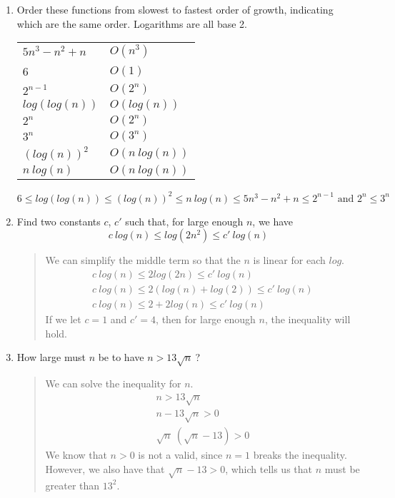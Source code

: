 \documentclass{hw}
\begin{document}

\begin{enumerate}
\item Order these functions from slowest to fastest order of growth, indicating which are the same order.
Logarithms are all base 2.
\begin{center}
\begin{tabular}{l l}
$5n^3-n^2+n$ & $O(n^3)$\\
6 & $O(1)$\\
$2^{n-1}$ & $O(2^{n})$\\
$log(log(n))$ & $O(log(n))$\\
$2^{n}$ & $O(2^n)$\\
$3^{n}$ & $O(3^n)$\\
$(log(n))^2$ & $O(n\ log(n))$\\
$n\ log(n)$ & $O(n\ log(n))$
\end{tabular}
\end{center}
\[
6 \leq log(log(n)) \leq (log(n))^{2} \leq n\ log(n) \leq 5n^3-n^2+n \leq 2^{n-1}\text{ and } 2^n \leq
3^{n}
\]

\item Find two constants $c$, $c'$ such that, for large enough $n$, we have
\[ c\ log(n) \leq log(2n^2) \leq c'\ log(n) \]
\begin{quote}
We can simplify the middle term so that the $n$ is linear for each $log$.
\begin{gather*}
c\ log(n) \leq 2log(2n) \leq c'\ log(n)\\
c\ log(n) \leq 2(log(n) + log(2)) \leq c'\ log(n)\\
c\ log(n) \leq 2 + 2log(n) \leq c'\ log(n)
\end{gather*}
If we let $c = 1$ and $c' = 4$, then for large enough $n$, the inequality will hold.
\end{quote}

\item How large must $n$ be to have $n > 13\sqrt{n}\ $?
\begin{quote}
We can solve the inequality for $n$.
\begin{gather*}
n > 13\sqrt{n}\\
n - 13\sqrt{n} > 0\\
\sqrt{n}\ (\sqrt{n} - 13) > 0
\end{gather*}
We know that $n > 0$ is not a valid, since $n = 1$ breaks the inequality. However, we also have that
$\sqrt{n} - 13 > 0$, which tells us that $n$ must be greater than $13^2$.
\end{quote}
\end{enumerate}
\end{document}
